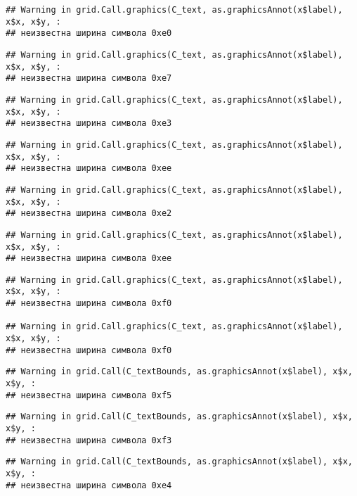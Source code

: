 \documentclass[
]{article}
\begin{document}
\begin{verbatim}
## Warning in grid.Call.graphics(C_text, as.graphicsAnnot(x$label), x$x, x$y, :
## неизвестна ширина символа 0xe0
\end{verbatim}

\begin{verbatim}
## Warning in grid.Call.graphics(C_text, as.graphicsAnnot(x$label), x$x, x$y, :
## неизвестна ширина символа 0xe7
\end{verbatim}

\begin{verbatim}
## Warning in grid.Call.graphics(C_text, as.graphicsAnnot(x$label), x$x, x$y, :
## неизвестна ширина символа 0xe3
\end{verbatim}

\begin{verbatim}
## Warning in grid.Call.graphics(C_text, as.graphicsAnnot(x$label), x$x, x$y, :
## неизвестна ширина символа 0xee
\end{verbatim}

\begin{verbatim}
## Warning in grid.Call.graphics(C_text, as.graphicsAnnot(x$label), x$x, x$y, :
## неизвестна ширина символа 0xe2
\end{verbatim}

\begin{verbatim}
## Warning in grid.Call.graphics(C_text, as.graphicsAnnot(x$label), x$x, x$y, :
## неизвестна ширина символа 0xee
\end{verbatim}

\begin{verbatim}
## Warning in grid.Call.graphics(C_text, as.graphicsAnnot(x$label), x$x, x$y, :
## неизвестна ширина символа 0xf0

## Warning in grid.Call.graphics(C_text, as.graphicsAnnot(x$label), x$x, x$y, :
## неизвестна ширина символа 0xf0
\end{verbatim}

\begin{verbatim}
## Warning in grid.Call(C_textBounds, as.graphicsAnnot(x$label), x$x, x$y, :
## неизвестна ширина символа 0xf5
\end{verbatim}

\begin{verbatim}
## Warning in grid.Call(C_textBounds, as.graphicsAnnot(x$label), x$x, x$y, :
## неизвестна ширина символа 0xf3
\end{verbatim}

\begin{verbatim}
## Warning in grid.Call(C_textBounds, as.graphicsAnnot(x$label), x$x, x$y, :
## неизвестна ширина символа 0xe4
\end{verbatim}
\end{document}
